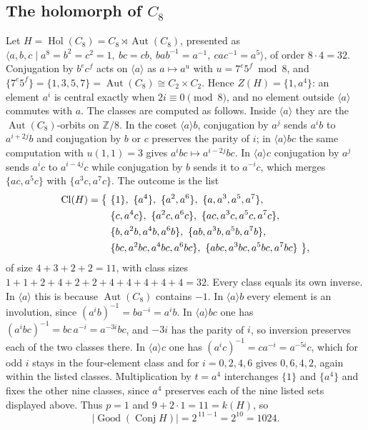 \documentclass[11pt]{amsart}
\theoremstyle{definition}
\newcommand{\Conj}{\operatorname{Conj}}
\newcommand{\Good}{\operatorname{Good}}
\newcommand{\Cl}{\operatorname{Cl}}
\newcommand{\Zc}{Z}
\newcommand{\Hol}{\operatorname{Hol}}
\newcommand{\Aut}{\operatorname{Aut}}
\begin{document}
\subsection*{The holomorph of \texorpdfstring{$C_8$}{C8}}
Let $H=\Hol(C_8)=C_8\rtimes\Aut(C_8)$, presented as
$\langle a,b,c\mid a^8=b^2=c^2=1,\ bc=cb,\ bab^{-1}=a^{-1},\ cac^{-1}=a^5\rangle$, of order
$8\cdot 4=32$. Conjugation by $b^{e}c^{f}$ acts on $\langle a\rangle$ as
$a\mapsto a^{u}$ with $u=7^{e}5^{f}\bmod 8$, and
$\{7^{e}5^{f}\}=\{1,3,5,7\}=\Aut(C_8)\cong C_2\times C_2$. Hence
$\Zc(H)=\{1,a^{4}\}$: an element $a^{i}$ is central exactly when $2i\equiv 0 \pmod 8$, and
no element outside $\langle a\rangle$ commutes with $a$. The classes are computed as
follows. Inside $\langle a\rangle$ they are the $\Aut(C_8)$-orbits on $\mathbb Z/8$. In the
coset $\langle a\rangle b$, conjugation by $a^{j}$ sends $a^{i}b$ to $a^{i+2j}b$ and
conjugation by $b$ or $c$ preserves the parity of $i$; in $\langle a\rangle bc$ the same
computation with $u(1,1)=3$ gives $a^{i}bc\mapsto a^{i-2j}bc$. In $\langle a\rangle c$
conjugation by $a^{j}$ sends $a^{i}c$ to $a^{i-4j}c$ while conjugation by $b$ sends it to
$a^{-i}c$, which merges $\{ac,a^{5}c\}$ with $\{a^{3}c,a^{7}c\}$. The outcome is the list
\begin{align}
\Cl(H)=\bigl\{\ &\{1\},\ \{a^{4}\},\ \{a^{2},a^{6}\},\ \{a,a^{3},a^{5},a^{7}\},\notag\\
                &\{c,a^{4}c\},\ \{a^{2}c,a^{6}c\},\ \{ac,a^{3}c,a^{5}c,a^{7}c\},\notag\\
                &\{b,a^{2}b,a^{4}b,a^{6}b\},\ \{ab,a^{3}b,a^{5}b,a^{7}b\},\notag\\
                &\{bc,a^{2}bc,a^{4}bc,a^{6}bc\},\ \{abc,a^{3}bc,a^{5}bc,a^{7}bc\}\ \bigr\},
\label{eq:clH}
\end{align}
of size $4+3+2+2=11$, with class sizes $1+1+2+4+2+2+4+4+4+4+4=32$. Every class equals its
own inverse. In $\langle a\rangle$ this is because $\Aut(C_8)$ contains $-1$. In
$\langle a\rangle b$ every element is an involution, since
$(a^{i}b)^{-1}=ba^{-i}=a^{i}b$. In $\langle a\rangle bc$ one has
$(a^{i}bc)^{-1}=bc\,a^{-i}=a^{-3i}bc$, and $-3i$ has the parity of $i$, so inversion
preserves each of the two classes there. In $\langle a\rangle c$ one has
$(a^{i}c)^{-1}=ca^{-i}=a^{-5i}c$, which for odd $i$ stays in the four-element class and for
$i=0,2,4,6$ gives $0,6,4,2$, again within the listed classes.
Multiplication by $t=a^{4}$ interchanges $\{1\}$ and $\{a^{4}\}$
and fixes the other nine classes, since $a^{4}$ preserves each of the nine listed sets
displayed above. Thus $p=1$ and $9+2\cdot 1=11=k(H)$, so
\[
 \lvert\Good(\Conj H)\rvert=2^{\,11-1}=2^{10}=1024 .
\]
\end{document}
